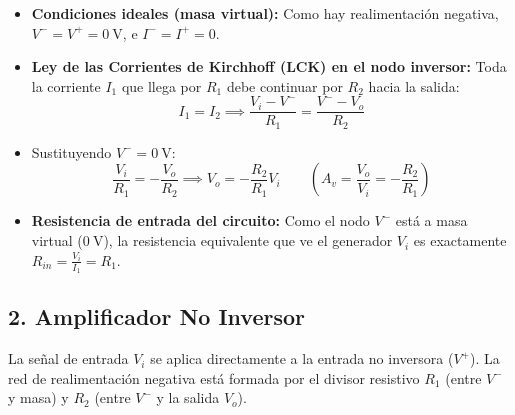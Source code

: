 \begin{itemize}[leftmargin=*]
    \item \textbf{Condiciones ideales (masa virtual):} Como hay realimentación negativa, $V^- = V^+ = 0\ \si{\volt}$, e $I^- = I^+ = 0$.
    \item \textbf{Ley de las Corrientes de Kirchhoff (LCK) en el nodo inversor:} Toda la corriente $I_1$ que llega por $R_1$ debe continuar por $R_2$ hacia la salida:
    \begin{equation}
        I_1 = I_2 \implies \frac{V_i - V^-}{R_1} = \frac{V^- - V_o}{R_2}
    \end{equation}
    \item Sustituyendo $V^- = 0\ \si{\volt}$:
    \begin{equation}
        \frac{V_i}{R_1} = -\frac{V_o}{R_2} \implies \boxed{V_o = -\frac{R_2}{R_1} V_i} \qquad \left(A_v = \frac{V_o}{V_i} = -\frac{R_2}{R_1}\right)
    \end{equation}
    \item \textbf{Resistencia de entrada del circuito:} Como el nodo $V^-$ está a masa virtual ($0\ \si{\volt}$), la resistencia equivalente que ve el generador $V_i$ es exactamente $R_{in} = \frac{V_i}{I_1} = R_1$.
\end{itemize}

\subsection{2. Amplificador No Inversor}

La señal de entrada $V_i$ se aplica directamente a la entrada no inversora ($V^+$). La red de realimentación negativa está formada por el divisor resistivo $R_1$ (entre $V^-$ y masa) y $R_2$ (entre $V^-$ y la salida $V_o$).

\begin{center}
\end{center}

